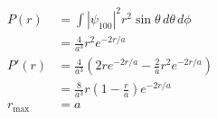 \documentclass{article}
\begin{document}
\subsection{}

\begin{align*}
  P(r)         & = \int |\psi_{100}|^2 r^2 \sin \theta \,d \theta \,d \phi                      \\
               & = \frac{4}{a^3} r^2 e^{-2 r / a}                                               \\
  P'(r)        & = \frac{4}{a^3} \left( 2 r e^{-2 r / a} - \frac{2}{a} r^2 e^{-2 r / a} \right) \\
               & = \frac{8}{a^3} r \left( 1 - \frac{r}{a} \right) e^{-2 r / a}                  \\
  r_\text{max} & = a
\end{align*}

\setcounter{subsection}{17}
\subsection{}
\end{document}
